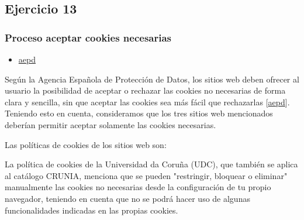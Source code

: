 \subsection{Ejercicio 13}
\graphicspath{ {img/13} }

\subsubsection{Proceso aceptar cookies necesarias}

\begin{itemize}
    \item \href{https://www.aepd.es/guias/guia-cookies.pdf}{aepd}
\end{itemize}

Según la Agencia Española de Protección de Datos, los sitios web deben ofrecer al usuario la posibilidad de aceptar o rechazar las cookies no necesarias de forma clara y sencilla, sin que aceptar las cookies sea más fácil que rechazarlas [\url{aepd}]. Teniendo esto en cuenta, consideramos que los tres sitios web mencionados deberían permitir aceptar solamente las cookies necesarias. 

Las políticas de cookies de los sitios web son:

La política de cookies de la Universidad da Coruña (UDC), que también se aplica al catálogo CRUNIA, menciona que se pueden "restringir, bloquear o eliminar" manualmente las cookies no necesarias desde la configuración de tu propio navegador, teniendo en cuenta que no se podrá hacer uso de algunas funcionalidades indicadas en las propias cookies.  

